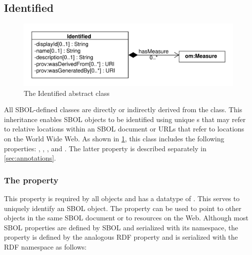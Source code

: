 
\subsection {Identified}
\label{sec:Identified}

\begin{figure}[ht]
\begin{center}
\includegraphics[scale=0.6]{uml/identified}
\caption[]{The Identified abstract class}
\label{uml:identified}
\end{center}
\end{figure}

All SBOL-defined classes are directly or indirectly derived from the   class. This inheritance enables SBOL objects to be identified using unique s that may refer to relative locations within an SBOL document or URLs that refer to locations on the World Wide Web. As shown in \ref{uml:identified}, this class includes the following properties: , ,  , and . The latter property is described separately in \ref{sec:annotations}.

\subsubsection*{The  property}
\label{sec:identity}
This property is required by all  objects and has a datatype of . This  serves to uniquely identify an SBOL object. The  property can be used to point to other objects in the same SBOL document or to resources on the Web. Although most SBOL properties are defined by SBOL and serialized with its namespace, the  property is defined by the analogous RDF  property and is serialized with the RDF namespace as follows:

